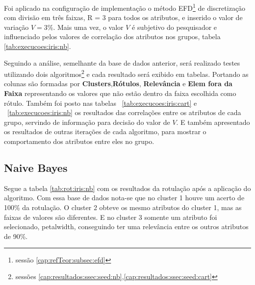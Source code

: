 Foi aplicado na configuração de implementação o método EFD\footnote{sessão \ref{cap:refTeor:subsec:efd}} de discretização com divisão em três faixas, R = 3 para todos os atributos, e inserido o valor de variação ${V=3\%}$. Mais uma vez, o valor ${V}$ é subjetivo do pesquisador e influenciado pelos valores de correlação dos atributos nos grupos, tabela \ref{tab:execucoes:iris:nb}.

Seguindo a análise, semelhante da base de dados anterior, será realizado testes utilizando dois algoritmos\footnote{sessões \ref{cap:resultados:ssec:seed:nb},\ref{cap:resultados:ssec:seed:cart}} e cada resultado será exibido em tabelas. Portando as colunas são formadas por \textbf{Clusters},\textbf{Rótulos}, \textbf{Relevância} e \textbf{Elem fora da Faixa} representando os valores que não estão dentro da faixa escolhida como rótulo. Também foi posto nas tabelas ~\ref{tab:execucoes:iris:cart} e ~\ref{tab:execucoes:iris:nb} os resultados das correlações entre os atributos de cada grupo, servindo de informação para decisão do valor de ${V}$. E também apresentado os resultados de outras iterações de cada algoritmo, para mostrar o comportamento dos atributos entre eles no grupo.

\subsection{Naive Bayes} \label{cap:resultados:ssec:iris:nb}

Segue a tabela \ref{tab:rot:iris:nb} com os resultados da rotulação após a aplicação do algoritmo. Com essa base de dados nota-se que no cluster 1 houve um acerto de 100\% da rotulação. O cluster 2 obteve os mesmo atributos do cluster 1, mas as faixas de valores são diferentes. E no cluster 3 somente um atributo foi selecionado, petalwidth, conseguindo ter uma relevância entre os outros atributos de 90\%.

